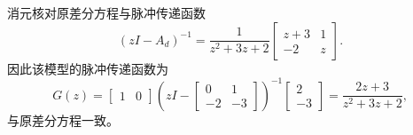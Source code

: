 \documentclass[11pt]{article}
\begin{document}
\begin{solution}
\begin{proofstep}{消元核对原差分方程与脉冲传递函数}
\[(zI-A_d)^{-1}=\frac1{z^2+3z+2}\begin{bmatrix}z+3&1\\-2&z\end{bmatrix}.
\]
因此该模型的脉冲传递函数为
\[
G(z)=\begin{bmatrix}1&0\end{bmatrix}
\left(zI-\begin{bmatrix}0&1\\-2&-3\end{bmatrix}\right)^{-1}
\begin{bmatrix}2\\-3\end{bmatrix}
=\frac{2z+3}{z^2+3z+2},
\]
与原差分方程一致。
\end{proofstep}
\end{solution}
\end{document}
